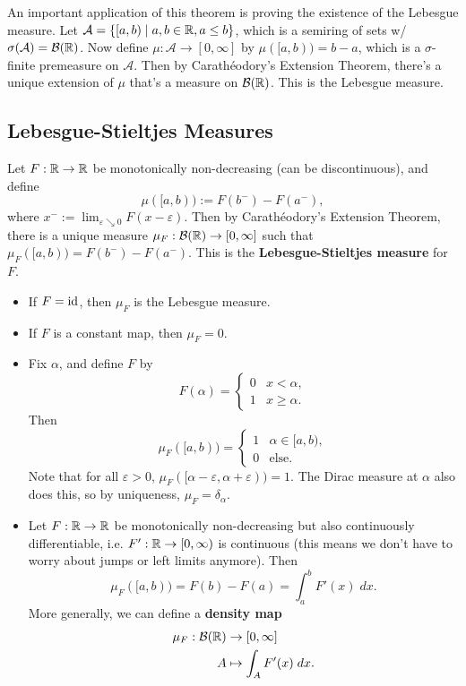 \documentclass[twoside,10pt]{article}
\begin{document}
An important application of this theorem is proving the existence of the Lebesgue measure. Let $\mathcal{A} = \left\{ [a,b) \;|\; a,b \in \mathbb{R}, a\leq b \right\}$, which is a semiring of sets w/ $\sigma(\mathcal{A}) = \mathcal{B}(\mathbb{R})$. Now define $\mu:\mathcal{A} \to [0,\infty]$ by $\mu([a,b)) = b-a$, which is a $\sigma$-finite premeasure on $\mathcal{A}$. Then by Carath\'eodory's Extension Theorem, there's a unique extension of $\mu$ that's a measure on $\mathcal{B}(\mathbb{R})$. This is the Lebesgue measure.

\subsection{Lebesgue-Stieltjes Measures}

Let $F:\mathbb{R}\to \mathbb{R}$ be monotonically non-decreasing (can be discontinuous), and define
\[\mu([a,b)) := F(b^{-}) - F(a^{-}), \]
where $x^{-} := \lim_{\varepsilon \searrow 0} F(x-\varepsilon)$. Then by Carath\'eodory's Extension Theorem, there is a unique measure $\mu_{F}: \mathcal{B}(\mathbb{R})\to [0,\infty]$ such that $\mu_{F}([a,b)) = F(b^{-}) - F(a^{-})$. This is the \textbf{Lebesgue-Stieltjes measure} for $F$.

\begin{itemize}
	\item If $F = \operatorname{id}$, then $\mu_{F}$ is the Lebesgue measure.
	\item If $F$ is a constant map, then $\mu_{F} = 0$.
	\item Fix $\alpha$, and define $F$ by
		\[
		F(\alpha)=
		\begin{cases}
			0 & x < \alpha, \\
			1 & x \geq \alpha.
		\end{cases}
		\] 
		Then
		\[
		\mu_{F}([a,b))=
		\begin{cases}
			1 & \alpha \in [a,b), \\
			0 & \text{else}.
		\end{cases}
		\] 
		Note that for all $ \varepsilon>0$, $\mu_{F}([\alpha-\varepsilon, \alpha+\varepsilon))=1$. The Dirac measure at $\alpha$ also does this, so by uniqueness, $\mu_{F} = \delta_{\alpha}$.
	\item Let $F:\mathbb{R}\to \mathbb{R}$ be monotonically non-decreasing but also continuously differentiable, i.e. $F':\mathbb{R}\to [0,\infty)$ is continuous (this means we don't have to worry about jumps or left limits anymore). Then
		\[
		\mu_{F}([a,b)) = F(b)-F(a) = \int_{a}^{b} F'(x)\;dx.
		\] More generally, we can define a \textbf{density map} 
		\begin{align*}
			\mu_{F}: \mathcal{B}(\mathbb{R}) &\to [0,\infty] \\
			A &\mapsto \int_{A} F'(x)\;dx.
		\end{align*}
\end{itemize}
\end{document}
